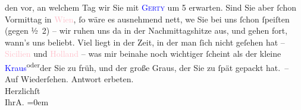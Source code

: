                den \label{K_L01407_1v}\label{K_L01407_1h} vor, an
               welchem Tag wir Sie mit \textcolor{blue}{\textsc{Gerty}}{}\ledrightnote{\textcolor{blue}{Gertrude von Hofmannsthal}} um 5 erwarten. Sind Sie aber {\pb}ſchon
                  Vormittag in \textcolor{pink}{Wien}{}\ledrightnote{\textcolor{pink}{Wien}}, ſo wäre es
               ausnehmend nett, we{\geminationn}{ }Sie bei uns ſchon ſpeiſten (gegen ½ 2)
               – wir ruhen uns da{\geminationn} in der Nachmittagshitze aus, und
               gehen fort, wann’s uns beliebt. Viel liegt in der Zeit, in der man ſich nicht geſehen
               hat – \textcolor{pink}{Sicilien}{}\ledrightnote{\textcolor{pink}{Sizilien}} und \textcolor{pink}{Holland}{}\ledrightnote{\textcolor{pink}{Niederlande}} – was mir beinahe noch wichtiger ſcheint als der kleine \textcolor{blue}{Kraus}{}\ledrightnote{\textcolor{blue}{Karl Kraus}}{ }\substVorne{}\textsuperscript{oder}\substDazwischen{}der Sie zu früh, und\substHinten{} der große Graus, der Sie zu ſpät gepackt hat. –\pend
           \pstart
           Auf Wiederſehen. Antwort erbeten.{\\[\baselineskip]}Herzlichſt{\\[\baselineskip]}Ihr\spacefill\mbox{A.}\pend
           \leftskip=0em{}\endnumbering{}  
      